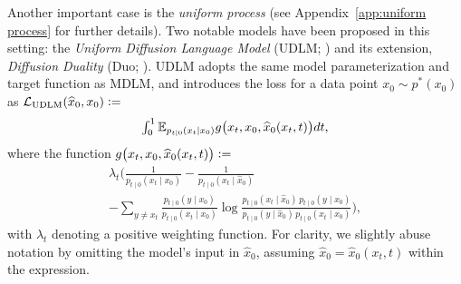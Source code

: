   Another important case is the \textit{uniform process} (see Appendix~\ref{app:uniform process} for further details). Two notable models have been proposed in this setting: the \textit{Uniform Diffusion Language Model} (UDLM; \citealp{schiff2024discreteguidance}) and its extension, \textit{Diffusion Duality} (Duo; \citealp{sahoo2025the}). UDLM adopts the same model parameterization and target function as MDLM, and introduces the loss for a data point $x_0 \sim p^*(x_0)$ as $\mathcal{L}_{\text{UDLM}}(\widehat{x}_0,x_0) \vcentcolon=$
  \begin{equation}
    \textstyle \int_0^1 \mathbb{E}_{p_{t|0}(x_t \mid x_0)} g\bigl(x_t, x_0, \widehat{x}_0(x_t, t)\bigr) dt,
  \label{eq:udlm loss}
  \end{equation}
  where the function $g\bigl(x_t, x_0, \widehat{x}_0(x_t, t)\bigr) \vcentcolon=$
  \begin{gather}
       \lambda_{t}\Bigg(\frac{1}{p_{t\mid0}(x_t \mid x_0)} - \frac{1}{p_{t \mid 0}(x_t \mid \widehat{x}_0)} \nonumber 
          \\ 
          - \sum_{y \neq x_t} \frac{p_{t \mid 0}(y \mid x_0)}{p_{t\mid0}(x_t \mid x_0)}\log\frac{p_{t \mid 0}(x_t \mid \widehat{x}_0) \, p_{t \mid 0}(y \mid x_0)}{p_{t \mid 0}(y \mid \widehat{x}_0) \, p_{t \mid 0}(x_t \mid x_0)}\Bigg), \nonumber
  \end{gather}
  with $\lambda_t$ denoting a positive weighting function. For clarity, we slightly abuse notation by omitting the model's input in $\widehat{x}_0$, assuming $\widehat{x}_0 = \widehat{x}_0(x_t, t)$ within the expression.
  
